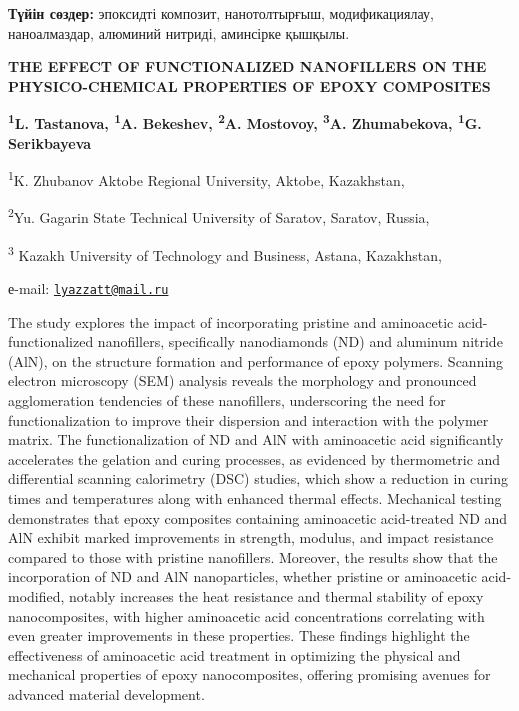 {\bfseries Түйін сөздер:} эпоксидті композит, нанотолтырғыш,
модификациялау, наноалмаздар, алюминий нитриді, аминсірке қышқылы.

{\bfseries THE EFFECT OF FUNCTIONALIZED NANOFILLERS ON THE PHYSICO-CHEMICAL
PROPERTIES OF EPOXY COMPOSITES}

{\bfseries \textsuperscript{1}L. Tastanova\textsuperscript{\envelope },
\textsuperscript{1}A. Bekeshev, \textsuperscript{2}A. Mostovoy,
\textsuperscript{3}A. Zhumabekova, \textsuperscript{1}G. Serikbayeva}

\textsuperscript{1}K. Zhubanov Aktobe Regional University, Aktobe,
Kazakhstan,

\textsuperscript{2}Yu. Gagarin State Technical University of Saratov,
Saratov, Russia,

\textsuperscript{3} Kazakh University of Technology and Business,
Astana, Kazakhstan,

е-mail: \href{mailto:lyazzatt@mail.ru}{\nolinkurl{lyazzatt@mail.ru}}

The study explores the impact of incorporating pristine and aminoacetic
acid-functionalized nanofillers, specifically nanodiamonds (ND) and
aluminum nitride (AlN), on the structure formation and performance of
epoxy polymers. Scanning electron microscopy (SEM) analysis reveals the
morphology and pronounced agglomeration tendencies of these nanofillers,
underscoring the need for functionalization to improve their dispersion
and interaction with the polymer matrix. The functionalization of ND and
AlN with aminoacetic acid significantly accelerates the gelation and
curing processes, as evidenced by thermometric and differential scanning
calorimetry (DSC) studies, which show a reduction in curing times and
temperatures along with enhanced thermal effects. Mechanical testing
demonstrates that epoxy composites containing aminoacetic acid-treated
ND and AlN exhibit marked improvements in strength, modulus, and impact
resistance compared to those with pristine nanofillers. Moreover, the
results show that the incorporation of ND and AlN nanoparticles, whether
pristine or aminoacetic acid-modified, notably increases the heat
resistance and thermal stability of epoxy nanocomposites, with higher
aminoacetic acid concentrations correlating with even greater
improvements in these properties. These findings highlight the
effectiveness of aminoacetic acid treatment in optimizing the physical
and mechanical properties of epoxy nanocomposites, offering promising
avenues for advanced material development.

